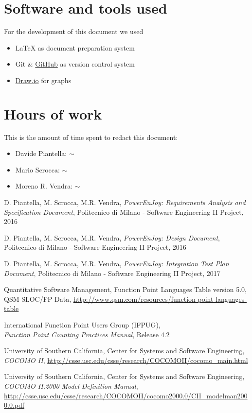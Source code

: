 \begin{appendices}

	\section{Software and tools used}
	For the development of this document we used
	\begin{itemize}
		\item \LaTeX{} as document preparation system
		\item Git \& \href{http://github.com}{GitHub} as version control system
		\item \href{http://draw.io}{Draw.io} for graphs 
	\end{itemize}
	
	\section{Hours of work}
	This is the amount of time spent to redact this document:
	\begin{itemize}
		\item Davide Piantella: $\sim$ 
		\item Mario Scrocca: $\sim$ 
		\item Moreno R. Vendra: $\sim$ 
	\end{itemize}
	
\end{appendices}


\begin{thebibliography}{9}

D. Piantella, M. Scrocca, M.R. Vendra, \emph{PowerEnJoy: Requirements Analysis and Specification Document}, Politecnico di Milano - Software Engineering II Project, 2016

D. Piantella, M. Scrocca, M.R. Vendra, \emph{PowerEnJoy: Design Document}, Politecnico di Milano - Software Engineering II Project, 2016

D. Piantella, M. Scrocca, M.R. Vendra, \emph{PowerEnJoy: Integration Test Plan Document}, Politecnico di Milano - Software Engineering II Project, 2017

Quantitative Software Management, Function Point Languages Table version 5.0, QSM SLOC/FP Data, \url{http://www.qsm.com/resources/function-point-languages-table}

International Function Point Users Group (IFPUG),
\\\emph{Function Point Counting Practices Manual}, Release 4.2 

University of Southern California, Center for Systems and Software Engineering, \emph{COCOMO II}, \url{http://csse.usc.edu/csse/research/COCOMOII/cocomo_main.html}

University of Southern California, Center for Systems and Software Engineering, \emph{COCOMO II.2000 Model Definition Manual}, \url{http://csse.usc.edu/csse/research/COCOMOII/cocomo2000.0/CII_modelman2000.0.pdf}

\end{thebibliography}
